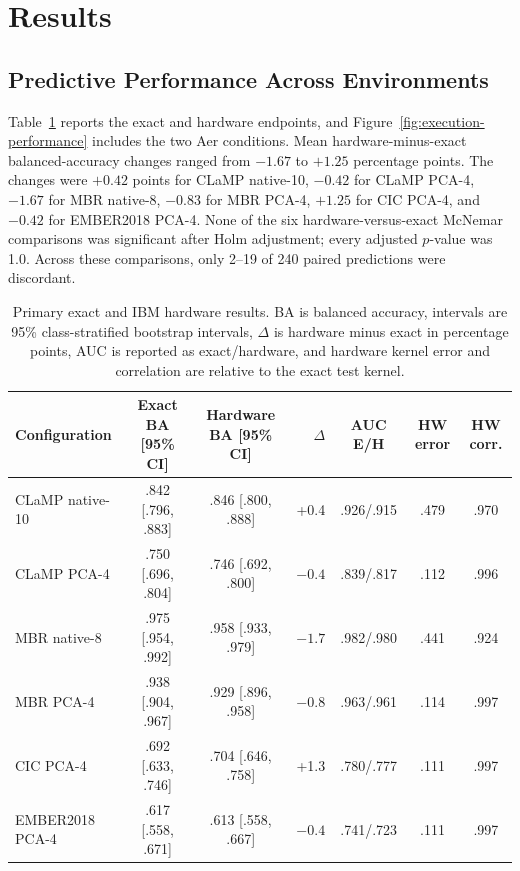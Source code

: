 \section{Results}

\subsection{Predictive Performance Across Environments}

Table~\ref{tab:primary-results} reports the exact and hardware endpoints, and Figure~\ref{fig:execution-performance} includes the two Aer conditions. Mean hardware-minus-exact balanced-accuracy changes ranged from $-1.67$ to $+1.25$ percentage points. The changes were $+0.42$ points for CLaMP native-10, $-0.42$ for CLaMP PCA-4, $-1.67$ for MBR native-8, $-0.83$ for MBR PCA-4, $+1.25$ for CIC PCA-4, and $-0.42$ for EMBER2018 PCA-4. None of the six hardware-versus-exact McNemar comparisons was significant after Holm adjustment; every adjusted $p$-value was 1.0. Across these comparisons, only 2--19 of 240 paired predictions were discordant.

\begin{table}[t]
\centering
\small
\caption{Primary exact and IBM hardware results. BA is balanced accuracy, intervals are 95\% class-stratified bootstrap intervals, $\Delta$ is hardware minus exact in percentage points, AUC is reported as exact/hardware, and hardware kernel error and correlation are relative to the exact test kernel.}
\label{tab:primary-results}
\begin{tabular}{lccrccc}
\toprule
Configuration & Exact BA [95\% CI] & Hardware BA [95\% CI] & $\Delta$ & AUC E/H & HW error & HW corr. \\
\midrule
CLaMP native-10 & .842 [.796, .883] & .846 [.800, .888] & +0.4 & .926/.915 & .479 & .970 \\
CLaMP PCA-4 & .750 [.696, .804] & .746 [.692, .800] & $-0.4$ & .839/.817 & .112 & .996 \\
MBR native-8 & .975 [.954, .992] & .958 [.933, .979] & $-1.7$ & .982/.980 & .441 & .924 \\
MBR PCA-4 & .938 [.904, .967] & .929 [.896, .958] & $-0.8$ & .963/.961 & .114 & .997 \\
CIC PCA-4 & .692 [.633, .746] & .704 [.646, .758] & +1.3 & .780/.777 & .111 & .997 \\
EMBER2018 PCA-4 & .617 [.558, .671] & .613 [.558, .667] & $-0.4$ & .741/.723 & .111 & .997 \\
\bottomrule
\end{tabular}
\end{table}

